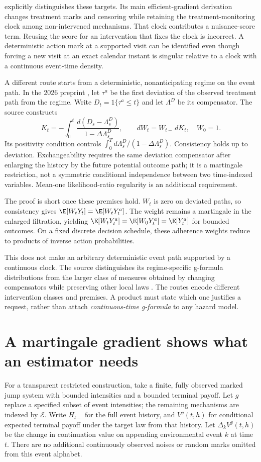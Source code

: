 \citet[Definitions 1--2]{rytgaard2021} explicitly distinguishes these
targets. Its main efficient-gradient derivation changes treatment marks
and censoring while retaining the treatment-monitoring clock among
non-intervened mechanisms. That clock contributes a nuisance-score term.
Reusing the score for an intervention that fixes the clock is incorrect.
A deterministic action mark at a supported visit can be identified even
though forcing a new visit at an exact calendar instant is singular
relative to a clock with a continuous event-time density.

A different route starts from a deterministic, nonanticipating regime on
the event path. In the 2026 preprint
\citet[Definition 3 and Theorem 1]{ryalen2026}, let $\tau^a$ be the first
deviation of the observed treatment path from the regime. Write
$D_t=1\{\tau^a\le t\}$ and let $\Lambda^D$ be its compensator.
The source constructs
\[
 K_t=-\int_0^t\frac{d(D_s-\Lambda^D_s)}{1-\Delta\Lambda^D_s},
 \qquad dW_t=W_{t-}\,dK_t,\quad W_0=1.
\]
Its positivity condition controls
$\int_0^T d\Lambda^D_s/(1-\Delta\Lambda^D_s)$.
Consistency holds up to deviation. Exchangeability requires the same
deviation compensator after enlarging the history by the future potential
outcome path; it is a martingale restriction, not a symmetric conditional
independence between two time-indexed variables. Mean-one likelihood-ratio
regularity is an additional requirement.

The proof is short once these premises hold. $W_t$ is zero on deviated
paths, so consistency gives $\E[W_tY_t]=\E[W_tY_t^a]$.
The weight remains a martingale in the enlarged filtration, yielding
$\E[W_tY_t^a]=\E[W_0Y_t^a]=\E[Y_t^a]$ for bounded outcomes.
On a fixed discrete decision schedule, these adherence weights reduce to
products of inverse action probabilities.

This does not make an arbitrary deterministic event path supported by a
continuous clock. The source distinguishes its regime-specific g-formula
distributions from the larger class of measures obtained by changing
compensators while preserving other local laws
\citep[Definition 5, Remark 2 and Theorem 2]{ryalen2026}.
The routes encode different intervention classes and premises. A product
must state which one justifies a request, rather than attach
\emph{continuous-time g-formula} to any hazard model.

\section{A martingale gradient shows what an estimator needs}
\label{r3:event-gradient}
For a transparent restricted construction, take a finite, fully observed
marked jump system with bounded intensities and a bounded terminal payoff.
Let $g$ replace a specified subset of event intensities; the remaining
mechanisms are indexed by $\mathcal E$. Write $H_{t-}$ for the full
event history, and $V^g(t,h)$ for conditional expected terminal payoff
under the target law from that history. Let $\Delta_kV^g(t,h)$ be the
change in continuation value on appending environmental event $k$ at
time $t$. There are no additional continuously observed noises or random
marks omitted from this event alphabet.

